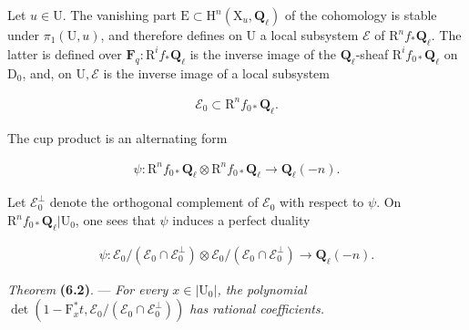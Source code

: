 \documentclass[10pt,leqno]{article}
\begin{document}
\noindent Let \(u\in \mathrm{U}\). The vanishing part \(\mathrm{E}\subset \mathrm{H}^{n}(\mathrm{X}_{u},\mathbf{Q}_{\ell })\) of the cohomology is stable under \(\pi _{1}(\mathrm{U},u)\), and therefore defines on \(\mathrm{U}\) a local subsystem \(\mathcal{E} \) of \(\mathrm{R}^{n} f_{*}\mathbf{Q}_{\ell }\). The latter is defined over \(\mathbf{F}_{q}: \mathrm{R}^{i} f_{*}\mathbf{Q}_{\ell }\) is the inverse image of the \(\mathbf{Q}_{\ell }\)-sheaf \(\mathrm{R}^{i} f_{0*}\mathbf{Q}_{\ell }\) on \(\mathrm{D}_{0}\), and, on \(\mathrm{U}, \mathcal{E} \) is the inverse image of a local subsystem\par

\begin{equation*}\begin{gathered}\mathcal{E} _{0} \subset  \mathrm{R}^{n} f_{0*}\mathbf{Q}_{\ell }.\end{gathered}\end{equation*}

\noindent The cup product is an alternating form\par

\begin{equation*}\begin{gathered}\psi  : \mathrm{R}^{n} f_{0*}\mathbf{Q}_{\ell }\otimes \mathrm{R}^{n} f_{0*}\mathbf{Q}_{\ell } \longrightarrow  \mathbf{Q}_{\ell }(- n).\end{gathered}\end{equation*}

\noindent Let \(\mathcal{E} _{0}^{\perp }\) denote the orthogonal complement of \(\mathcal{E} _{0}\) with respect to \(\psi \). On \(\mathrm{R}^{n} f_{0*}\mathbf{Q}_{\ell }|\mathrm{U}_{0}\), one sees that \(\psi \) induces a perfect duality\par

\begin{equation*}\begin{gathered}\psi  : \mathcal{E} _{0}/(\mathcal{E} _{0}\cap \mathcal{E} _{0}^{\perp })\otimes \mathcal{E} _{0}/(\mathcal{E} _{0}\cap \mathcal{E} _{0}^{\perp }) \longrightarrow  \mathbf{Q}_{\ell }(- n).\end{gathered}\end{equation*}

\noindent \emph{Theorem} \textbf{(6.2)}. — {\itshape For every \(x\in |\mathrm{U}_{0}|\), the polynomial \(\operatorname{det}(1- \mathrm{F}_{x}^{*}t,\mathcal{E} _{0}/(\mathcal{E} _{0}\cap \mathcal{E} _{0}^{\perp }))\) has rational coefficients.}\par
\end{document}

